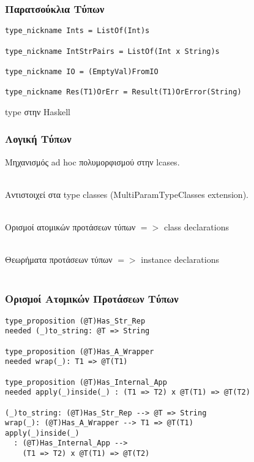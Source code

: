 \documentclass{beamer}
\def\e{\foreignlanguage{english}}
\def\h{\e{Haskell}}
\begin{document}
\begin{frame}[fragile]

\frametitle{Παρατσούκλια Τύπων}

\begin{otherlanguage}{english}
\begin{verbatim}
type_nickname Ints = ListOf(Int)s

type_nickname IntStrPairs = ListOf(Int x String)s

type_nickname IO = (EmptyVal)FromIO

type_nickname Res(T1)OrErr = Result(T1)OrError(String)

\end{verbatim}
\end{otherlanguage}

\e{type} στην \h

\end{frame}

\begin{frame}

\frametitle{Λογική Τύπων}

Μηχανισμός \e{ad hoc} πολυμορφισμού στην \e{lcases}.
\\~\

Αντιστοιχεί στα \e{type classes (MultiParamTypeClasses extension)}.
\\~\

Ορισμοί ατομικών προτάσεων τύπων $ => $ \e{class declarations}
\\~\

Θεωρήματα προτάσεων τύπων $ => $ \e{instance declarations}
\\~\

\end{frame}

\begin{frame}[fragile]

\frametitle{Ορισμοί Ατομικών Προτάσεων Τύπων}

\begin{otherlanguage}{english}
\begin{verbatim}
type_proposition (@T)Has_Str_Rep
needed (_)to_string: @T => String

type_proposition (@T)Has_A_Wrapper
needed wrap(_): T1 => @T(T1)

type_proposition (@T)Has_Internal_App
needed apply(_)inside(_) : (T1 => T2) x @T(T1) => @T(T2)

(_)to_string: (@T)Has_Str_Rep --> @T => String
wrap(_): (@T)Has_A_Wrapper --> T1 => @T(T1)
apply(_)inside(_)
  : (@T)Has_Internal_App -->
    (T1 => T2) x @T(T1) => @T(T2)
\end{verbatim}
\end{otherlanguage}

\end{frame}
\end{document}
